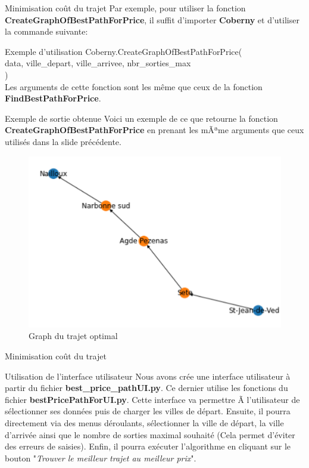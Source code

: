 \documentclass{beamer}
\begin{document}
	\begin{frame}{Minimisation coût du trajet}
		\tiny
		Par exemple, pour utiliser la fonction \textbf{CreateGraphOfBestPathForPrice}, il suffit d'importer \textbf{Coberny} et d'utiliser la commande suivante:
		\begin{block}{\tiny Exemple d'utilisation}
			\tiny
			Coberny.CreateGraphOfBestPathForPrice( \\
			data, ville\_depart, ville\_arrivee, nbr\_sorties\_max \\
			) \\
			Les arguments de cette fonction sont les même que ceux de la fonction \textbf{FindBestPathForPrice}.
		\end{block}
	
		\begin{block}{\tiny Exemple de sortie obtenue}
			\tiny
			Voici un exemple de ce que retourne la fonction \textbf{CreateGraphOfBestPathForPrice} en prenant les mÃªme arguments que ceux utilisés dans la slide précédente.
				\begin{figure}
					\begin{center}
						\includegraphics[scale=0.24]{graph_exemple.png}
						\caption{\tiny Graph du trajet optimal}
					\end{center}
				\end{figure}
		\end{block}
	\end{frame}

	\begin{frame}{Minimisation coût du trajet}
		\begin{block}{Utilisation de l'interface utilisateur}
			Nous avons crée une interface utilisateur à  partir du fichier \textbf{best\_price\_pathUI.py}. Ce dernier utilise les fonctions du fichier \textbf{bestPricePathForUI.py}.
			Cette interface va permettre Ã  l'utilisateur de sélectionner ses données puis de charger les villes de départ. Ensuite, il pourra directement via des menus déroulants, sélectionner la ville de départ, la ville d'arrivée ainsi que le nombre de sorties maximal souhaité (Cela permet d'éviter des erreurs de saisies). Enfin, il pourra exécuter l'algorithme en cliquant sur le bouton "\textit{Trouver le meilleur trajet au meilleur prix}".
		\end{block}
	\end{frame}
\end{document}
